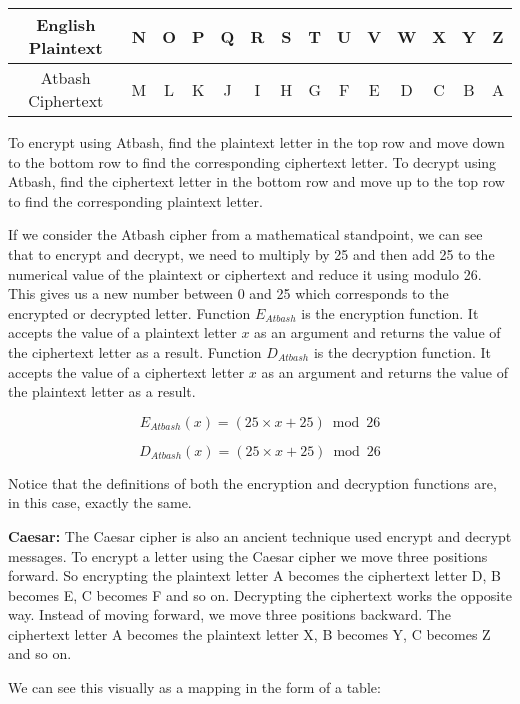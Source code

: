 \begin{center}
  \begin{tabular}{|c|c|c|c|c|c|c|c|c|c|c|c|c|c|}
  \hline
    English Plaintext & N & O & P & Q & R & S & T & U & V & W & X & Y & Z \\ \hline
    Atbash Ciphertext & M & L & K & J & I & H & G & F & E & D & C & B & A \\ \hline
  \end{tabular}
\end{center}

\normalsize

To encrypt using Atbash, find the plaintext letter in the top row and move down to the bottom row to find the corresponding ciphertext letter. To decrypt using Atbash, find the ciphertext letter in the bottom row and move up to the top row to find the corresponding plaintext letter.

If we consider the Atbash cipher from a mathematical standpoint, we can see that to encrypt and decrypt, we need to multiply by 25 and then add 25 to the numerical value of the plaintext or ciphertext and reduce it using modulo 26. This gives us a new number between 0 and 25 which corresponds to the encrypted or decrypted letter. Function $E_{Atbash}$ is the encryption function. It accepts the value of a plaintext letter $x$ as an argument and returns the value of the ciphertext letter as a result. Function $D_{Atbash}$ is the decryption function. It accepts the value of a ciphertext letter $x$ as an argument and returns the value of the plaintext letter as a result.

\[
  E_{Atbash}(x) = (25 \times x + 25) \bmod 26
\]

\[
  D_{Atbash}(x) = (25 \times x + 25) \bmod 26
\]

Notice that the definitions of both the encryption and decryption functions are, in this case, exactly the same.

{\bf Caesar:} The Caesar cipher is also an ancient technique used encrypt and decrypt messages. To encrypt a letter using the Caesar cipher we move three positions forward. So encrypting the plaintext letter A becomes the ciphertext letter D, B becomes E, C becomes F and so on. Decrypting the ciphertext works the opposite way. Instead of moving forward, we move three positions backward. The ciphertext letter A becomes the plaintext letter X, B becomes Y, C becomes Z and so on.

We can see this visually as a mapping in the form of a table:

